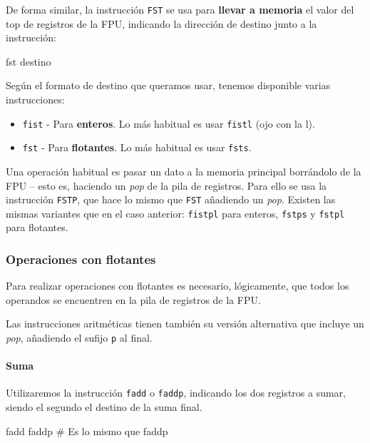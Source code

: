 \documentclass[11pt]{scrartcl}
\begin{document}
De forma similar, la instrucción \texttt{FST} se usa para \textbf{llevar a
  memoria} el valor del top de registros de la FPU, indicando la dirección de
destino junto a la instrucción:

\begin{gascode}
  fst destino
\end{gascode}

Según el formato de destino que queramos usar, tenemos disponible varias
instrucciones:

\begin{itemize}
\item \texttt{fist} - Para \textbf{enteros}. Lo más habitual es usar \texttt{fistl} (ojo con la l).
\item \texttt{fst} - Para \textbf{flotantes}. Lo más habitual es usar \texttt{fsts}.
\end{itemize}

Una operación habitual es pasar un dato a la memoria principal borrándolo de la
FPU -- esto es, haciendo un \textit{pop} de la pila de registros. Para ello se
usa la instrucción \texttt{FSTP}, que hace lo mismo que \texttt{FST} añadiendo
un \textit{pop}. Existen las mismas variantes que en el caso anterior:
\texttt{fistpl} para enteros, \texttt{fstps} y \texttt{fstpl} para flotantes.

\bigskip

\subsubsection{Operaciones con flotantes}

Para realizar operaciones con flotantes es necesario, lógicamente, que todos los
operandos se encuentren en la pila de registros de la FPU.

Las instrucciones aritméticas tienen también su versión alternativa que incluye
un \textit{pop}, añadiendo el sufijo \texttt{p} al final.

\paragraph{Suma}

Utilizaremos la instrucción \texttt{fadd} o \texttt{faddp}, indicando los dos
registros a sumar, siendo el segundo el destino de la suma final.

\begin{gascode}
  fadd %
  faddp  # Es lo mismo que faddp %
\end{gascode}
\end{document}
